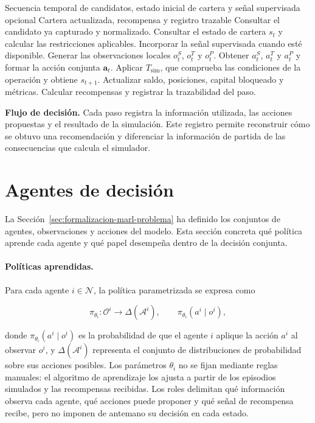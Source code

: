 \begin{algorithm}[H]
\caption{Flujo de información y decisión simulada}
\begin{algorithmic}[1]
\Require Secuencia temporal de candidatos, estado inicial de cartera y señal supervisada opcional
\Ensure Cartera actualizada, recompensa y registro trazable
\State Consultar el candidato ya capturado y normalizado.
\State Consultar el estado de cartera $s_t$ y calcular las restricciones aplicables.
\State Incorporar la señal supervisada cuando esté disponible.
\State Generar las observaciones locales $o_t^S$, $o_t^T$ y $o_t^P$.
\State Obtener $a_t^S$, $a_t^T$ y $a_t^P$ y formar la acción conjunta $\mathbf{a}_t$.
\State Aplicar $T_{\mathrm{sim}}$, que comprueba las condiciones de la operación y obtiene $s_{t+1}$.
\State Actualizar saldo, posiciones, capital bloqueado y métricas.
\State Calcular recompensas y registrar la trazabilidad del paso.
\EndFor
\end{algorithmic}
\end{algorithm}

\textbf{Flujo de decisión.} Cada paso registra la información utilizada, las acciones propuestas y el resultado de la simulación. Este registro permite reconstruir cómo se obtuvo una recomendación y diferenciar la información de partida de las consecuencias que calcula el simulador.

\section{Agentes de decisión}
\label{sec:agentes-decision}

La Sección~\ref{sec:formalizacion-marl-problema} ha definido los conjuntos de agentes, observaciones y acciones del modelo. Esta sección concreta qué política aprende cada agente y qué papel desempeña dentro de la decisión conjunta.

\paragraph{Políticas aprendidas.}
Para cada agente $i\in\mathcal{N}$, la política parametrizada se expresa como

\begin{equation}
\pi_{\theta_i}:\mathcal{O}^{i}\longrightarrow\Delta(\mathcal{A}^{i}),
\qquad
\pi_{\theta_i}(a^i\mid o^i),
\label{eq:politica-local-agente}
\end{equation}

donde $\pi_{\theta_i}(a^i\mid o^i)$ es la probabilidad de que el agente $i$ aplique la acción $a^i$ al observar $o^i$, y $\Delta(\mathcal{A}^{i})$ representa el conjunto de distribuciones de probabilidad sobre sus acciones posibles. Los parámetros $\theta_i$ no se fijan mediante reglas manuales: el algoritmo de aprendizaje los ajusta a partir de los episodios simulados y las recompensas recibidas. Los roles delimitan qué información observa cada agente, qué acciones puede proponer y qué señal de recompensa recibe, pero no imponen de antemano su decisión en cada estado.

